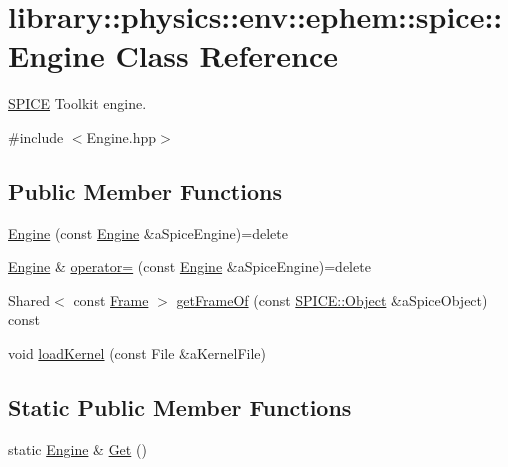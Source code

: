\hypertarget{classlibrary_1_1physics_1_1env_1_1ephem_1_1spice_1_1_engine}{}\section{library\+:\+:physics\+:\+:env\+:\+:ephem\+:\+:spice\+:\+:Engine Class Reference}
\label{classlibrary_1_1physics_1_1env_1_1ephem_1_1spice_1_1_engine}


\hyperlink{classlibrary_1_1physics_1_1env_1_1ephem_1_1_s_p_i_c_e}{S\+P\+I\+CE} Toolkit engine.  




{\ttfamily \#include $<$Engine.\+hpp$>$}

\subsection*{Public Member Functions}
\begin{DoxyCompactItemize}
\item 
\hyperlink{classlibrary_1_1physics_1_1env_1_1ephem_1_1spice_1_1_engine_a26bf9260d2730a6825a975c1a0b49b5b}{Engine} (const \hyperlink{classlibrary_1_1physics_1_1env_1_1ephem_1_1spice_1_1_engine}{Engine} \&a\+Spice\+Engine)=delete
\item 
\hyperlink{classlibrary_1_1physics_1_1env_1_1ephem_1_1spice_1_1_engine}{Engine} \& \hyperlink{classlibrary_1_1physics_1_1env_1_1ephem_1_1spice_1_1_engine_a6aca23c8962df540725dc0e9fbb3eb47}{operator=} (const \hyperlink{classlibrary_1_1physics_1_1env_1_1ephem_1_1spice_1_1_engine}{Engine} \&a\+Spice\+Engine)=delete
\item 
Shared$<$ const \hyperlink{classlibrary_1_1physics_1_1coord_1_1_frame}{Frame} $>$ \hyperlink{classlibrary_1_1physics_1_1env_1_1ephem_1_1spice_1_1_engine_af5bdad7a3783f772b726ac3f0cd09957}{get\+Frame\+Of} (const \hyperlink{classlibrary_1_1physics_1_1env_1_1ephem_1_1_s_p_i_c_e_a86f1a863677210ba8884807cc725c0f8}{S\+P\+I\+C\+E\+::\+Object} \&a\+Spice\+Object) const
\item 
void \hyperlink{classlibrary_1_1physics_1_1env_1_1ephem_1_1spice_1_1_engine_ada61913070593a15e7417ad300ae67d2}{load\+Kernel} (const File \&a\+Kernel\+File)
\end{DoxyCompactItemize}
\subsection*{Static Public Member Functions}
\begin{DoxyCompactItemize}
\item 
static \hyperlink{classlibrary_1_1physics_1_1env_1_1ephem_1_1spice_1_1_engine}{Engine} \& \hyperlink{classlibrary_1_1physics_1_1env_1_1ephem_1_1spice_1_1_engine_a9d5058448b12c353edcf5a420cec2745}{Get} ()
\end{DoxyCompactItemize}


